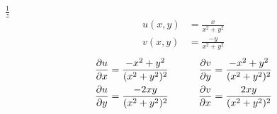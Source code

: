 \item[9.] $\frac{1}{z}$
\begin{align*}
    u(x,y) &= \frac{x}{x^2+y^2}\\
    v(x,y) &= \frac{-y}{x^2+y^2}
\end{align*}
\begin{align*}
    \frac{\partial u}{\partial x}  &= \frac{-x^2+y^2}{(x^2+y^2)^2}  
    &\qquad 
    \frac{\partial v}{\partial y}  &= \frac{-x^2+y^2}{(x^2+y^2)^2} \\
    \frac{\partial u}{\partial y}  &= \frac{-2xy}{(x^2+y^2)^2}  
    &\qquad 
    \frac{\partial v}{\partial x}  &= \frac{2xy}{(x^2+y^2)^2} 
\end{align*}
